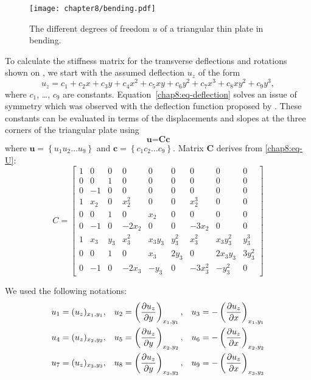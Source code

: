 \begin{figure}[ht]
\centering
\texttt{[image: chapter8/bending.pdf]}
\caption[The different degrees of freedom of a triangular thin plate in bending]{The different degrees of freedom $u$ of a triangular thin plate in bending.}
\label{chap8:fig-triangle}
\end{figure}
%
To calculate the stiffness matrix for the transverse deflections and rotations shown on , we start with the assumed deflection $u_z$ of the form
\begin{equation}
 u_z = c_1 + c_2x + c_3y + c_4x^2 + c_5xy + c_6y^2 + c_7x^3 + c_8xy^2 + c_9y^3,
\label{chap8:eq-deflection}
\end{equation} 
where $c_1$, \ldots , $c_9$ are constants. Equation~\ref{chap8:eq-deflection} solves an issue of symmetry which was observed with the deflection function proposed by \cite{Przemieniecki85}. These constants can be evaluated in terms of the displacements and slopes at the three corners of the triangular plate using 
\begin{equation}
\textbf{u} = \textbf{Cc}
\label{chap8:eq-U}
\end{equation} 
where $\textbf{u} = \left\{u_1 u_2 \ldots u_9 \right\} $ and $\textbf{c} = \left\{c_1 c_2 \ldots c_9 \right\} $. Matrix $\textbf{C}$ derives from \eqref{chap8:eq-U}:
\begin{equation}
C = 
	\begin{bmatrix}
	1 & 0 & 0 & 0 & 0 & 0 & 0 & 0 & 0 \\
 	0 & 0 & 1 & 0 & 0 & 0 & 0 & 0 & 0 \\
	0 & -1 & 0 & 0 & 0 & 0 & 0 & 0 & 0 \\
	1 & x_2 & 0 & x_2^2 & 0 & 0 & x_2^3 & 0 & 0 \\
	0 & 0 & 1 & 0 & x_2 & 0 & 0 & 0 & 0 \\
	0 & -1 & 0 & -2x_2 & 0 & 0 & -3x_2 & 0 & 0 \\
	1 & x_3 & y_3 & x_3^2 & x_3y_3 & y_3^2 & x_3^2 & x_3y_3^2& y_3^3 \\
	0 & 0 & 1 & 0 & x_3 & 2y_3 & 0 & 2x_3y_3 & 3y_3^2 \\
	0 & -1 & 0 & -2x_3 & -y_3 & 0 & -3x_3^2 & -y_3^2 & 0
	\end{bmatrix}
\end{equation} 

We used the following notations:
\begin{align}
u_1 &= (u_z)_{x_1,y_1}, & u_2 &= \left(\frac{\partial u_z}{\partial y}\right)_{x_1,y_1}, & u_3 &= - \left(\frac{\partial u_z}{\partial x}\right)_{x_1,y_1} \notag \\
u_4 &= (u_z)_{x_2,y_2}, & u_5 &= \left(\frac{\partial u_z}{\partial y}\right)_{x_2,y_2}, & u_6 &= - \left(\frac{\partial u_z}{\partial x}\right)_{x_2,y_2} \label{chap8:ui} \\
u_7 &= (u_z)_{x_3,y_3}, & u_8 &= \left(\frac{\partial u_z}{\partial y}\right)_{x_3,y_3}, & u_9 &= - \left(\frac{\partial u_z}{\partial x}\right)_{x_3,y_3} \notag \\
\end{align} 

